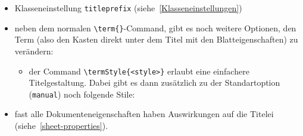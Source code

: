 \documentclass[
    titleprefix=AlgoTeX,
    inlineshortcut=java,
    corporatedesign,
    boxarc,
]{algoexercise}
\begin{document}
    \begin{itemize}
        \item Klasseneinstellung
            \verb+titleprefix+ (siehe~\ref{Klasseneinstellungen})
        \item neben dem normalen \verb+\term{}+-Command, gibt es noch weitere
            Optionen, den Term (also den Kasten direkt unter dem Titel mit den Blatteigenschaften) zu verändern:
            \begin{itemize}
                \item der
                    Command \verb+\termStyle{<style>}+ erlaubt eine einfachere Titelgestaltung.
                    Dabei gibt es dann zusätzlich zu der Standartoption (\verb+manual+) noch folgende Stile:
            \end{itemize}
        \item fast alle Dokumenteneigenschaften haben Auswirkungen auf die Titelei (siehe~\ref{sheet-properties}).
    \end{itemize}
    \clearpage
\end{document}

